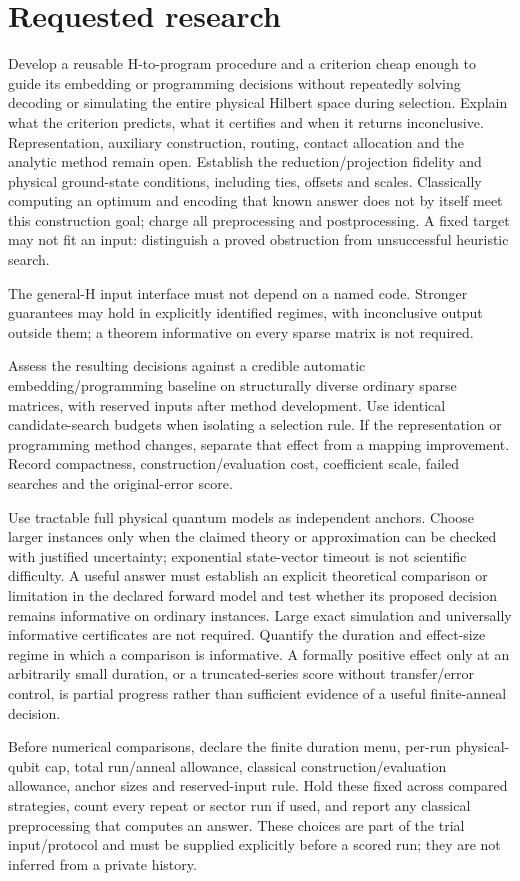 \documentclass[11pt,letterpaper]{article}
\begin{document}
\section{Requested research}
Develop a reusable H-to-program procedure and a criterion cheap enough to guide its embedding or programming decisions without repeatedly solving decoding or simulating the entire physical Hilbert space during selection. Explain what the criterion predicts, what it certifies and when it returns inconclusive. Representation, auxiliary construction, routing, contact allocation and the analytic method remain open. Establish the reduction/projection fidelity and physical ground-state conditions, including ties, offsets and scales. Classically computing an optimum and encoding that known answer does not by itself meet this construction goal; charge all preprocessing and postprocessing. A fixed target may not fit an input: distinguish a proved obstruction from unsuccessful heuristic search.\par
The general-H input interface must not depend on a named code. Stronger guarantees may hold in explicitly identified regimes, with inconclusive output outside them; a theorem informative on every sparse matrix is not required.\par
Assess the resulting decisions against a credible automatic embedding/programming baseline on structurally diverse ordinary sparse matrices, with reserved inputs after method development. Use identical candidate-search budgets when isolating a selection rule. If the representation or programming method changes, separate that effect from a mapping improvement. Record compactness, construction/evaluation cost, coefficient scale, failed searches and the original-error score.\par
Use tractable full physical quantum models as independent anchors. Choose larger instances only when the claimed theory or approximation can be checked with justified uncertainty; exponential state-vector timeout is not scientific difficulty. A useful answer must establish an explicit theoretical comparison or limitation in the declared forward model and test whether its proposed decision remains informative on ordinary instances. Large exact simulation and universally informative certificates are not required. Quantify the duration and effect-size regime in which a comparison is informative. A formally positive effect only at an arbitrarily small duration, or a truncated-series score without transfer/error control, is partial progress rather than sufficient evidence of a useful finite-anneal decision.\par
Before numerical comparisons, declare the finite duration menu, per-run physical-qubit cap, total run/anneal allowance, classical construction/evaluation allowance, anchor sizes and reserved-input rule. Hold these fixed across compared strategies, count every repeat or sector run if used, and report any classical preprocessing that computes an answer. These choices are part of the trial input/protocol and must be supplied explicitly before a scored run; they are not inferred from a private history.\par
{}
\end{document}
